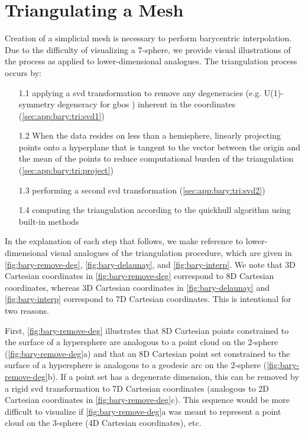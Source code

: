 \documentclass[final,12pt]{elsarticle}
\begin{document}
\section{Triangulating a Mesh}
\label{sec:app:bary:tri}

Creation of a simplicial mesh is necessary to perform barycentric interpolation. Due to the difficulty of visualizing a 7-sphere, we provide visual illustrations of the process as applied to lower-dimensional analogues. The triangulation process occurs by:
\begin{enumerate}%
	\item[1.1] applying a \gls{svd} transformation to remove any degeneracies (e.g. U(1)-symmetry degeneracy for \glspl{gbo} \cite{francisGeodesicOctonionMetric2019}) inherent in the coordinates (\cref{sec:app:bary:tri:svd1})
	\item[1.2] When the data resides on less than a hemisphere, linearly projecting points onto a hyperplane that is tangent to the vector between the origin and the mean of the \inpt{} points to reduce computational burden of the triangulation (\cref{sec:app:bary:tri:project})
	\item[1.3] performing a second \gls{svd} transformation (\cref{sec:app:bary:tri:svd2})
	\item[1.4] computing the triangulation according to the quickhull algorithm \cite{barberQuickhullAlgorithmConvex1996} using built-in methods
\end{enumerate}

In the explanation of each step that follows, we make reference to lower-dimensional visual analogues of the triangulation procedure, which are given in \cref{fig:bary-remove-deg}, \cref{fig:bary-delaunay}, and \cref{fig:bary-interp}. We note that 3D Cartesian coordinates in \cref{fig:bary-remove-deg} correspond to 8D Cartesian coordinates, whereas 3D Cartesian coordinates in \cref{fig:bary-delaunay} and \cref{fig:bary-interp} correspond to 7D Cartesian coordinates. This is intentional for two reasons.

First, \cref{fig:bary-remove-deg} illustrates that 8D Cartesian points constrained to the surface of a hypersphere are analogous to a point cloud on the 2-sphere (\cref{fig:bary-remove-deg}a) and that an 8D Cartesian point set constrained to the surface of a hypersphere is analogous to a geodesic arc on the 2-sphere (\cref{fig:bary-remove-deg}b). If a point set has a degenerate dimension, this can be removed by a rigid \gls{svd} transformation to 7D Cartesian coordinates (analogous to 2D Cartesian coordinates in \cref{fig:bary-remove-deg}c). This sequence would be more difficult to visualize if \cref{fig:bary-remove-deg}a was meant to represent a point cloud on the 3-sphere (4D Cartesian coordinates), etc.
\end{document}
